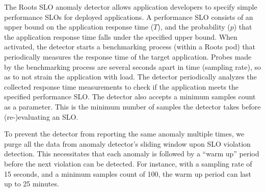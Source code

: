 The Roots SLO anomaly detector
allows application developers to specify simple performance SLOs for deployed applications. A
performance SLO consists of an upper bound on the application response time ($T$), and the probability ($p$)
that the application response time falls under the specified upper bound. 
When activated, the detector starts a benchmarking process (within a Roots pod)
that periodically measures the response time of the target application. Probes made by the benchmarking 
process are several seconds apart in time (sampling rate), so as to not strain the application with load.
The detector periodically
analyzes the collected response time measurements to check if the application meets the specified performance
SLO. The detector also accepts a minimum samples count as a parameter. This is the minimum number of 
samples the detector takes before (re-)evaluating an SLO.



To prevent the detector from reporting the same anomaly multiple times,
we purge all the data from anomaly detector's sliding window upon SLO violation detection.
This necessitates that each anomaly is followed by a ``warm up'' period before the next violation 
can be detected.  For instance, with a sampling rate of 15 seconds, and a minimum
samples count of 100, the warm up period can last up to 25 minutes.

